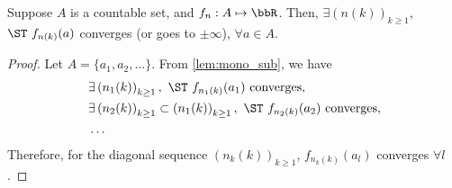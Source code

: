 \documentclass[../aipt.tex]{subfiles}
\begin{document}
\begin{Lemma} \label{wk9:lemma:Cantor_diag}
Suppose $A$ is a countable set, and $f_n:A \mapsto \bbR$. Then, $\exists \left(n(k)\right)_{k \geq 1}$, $\ST\ f_{n(k)}(a)$ converges (or goes to $\pm \infty$), $\forall a \in A$.
\end{Lemma}
\begin{proof}
Let $A = \{a_1, a_2, \ldots\}$. From \cref{lem:mono_sub}, we have
\begin{align*}
& \exists \left(n_1(k)\right)_{k \geq 1}, \ \ST\ f_{n_1(k)}(a_1)\ \text{converges}, \\
& \exists \left(n_2(k)\right)_{k \geq 1} \subset \left(n_1(k)\right)_{k \geq 1}, \ \ST\ f_{n_2(k)}(a_2)\ \text{converges}, \\
& \ldots
\end{align*}
Therefore, for the diagonal sequence $\left(n_k(k)\right)_{k \geq 1}$, $f_{n_{k}(k)}(a_{l})$ converges $\forall l$.
\end{proof}
\end{document}
